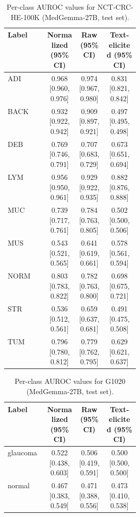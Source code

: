 \begin{table}[htbp]
\centering
\footnotesize
\setlength{\tabcolsep}{4pt}
\caption{Per-class AUROC values for NCT-CRC-HE-100K (MedGemma-27B, test set).}\label{tab:auroc_NCT_CRC_HE_100K_1000}
\begin{tabular}{p{0.3\linewidth}ccc}
\toprule
Label & Normalized (95\% CI) & Raw (95\% CI) & Text-elicited (95\% CI) \\
\midrule
ADI & 0.968 [0.960, 0.976] & 0.974 [0.967, 0.980] & 0.831 [0.821, 0.842] \\
BACK & 0.932 [0.922, 0.942] & 0.909 [0.897, 0.921] & 0.497 [0.495, 0.498] \\
DEB & 0.769 [0.746, 0.791] & 0.707 [0.683, 0.729] & 0.673 [0.651, 0.694] \\
LYM & 0.956 [0.950, 0.961] & 0.929 [0.922, 0.935] & 0.882 [0.876, 0.888] \\
MUC & 0.739 [0.717, 0.761] & 0.784 [0.763, 0.805] & 0.502 [0.500, 0.506] \\
MUS & 0.543 [0.521, 0.565] & 0.641 [0.619, 0.661] & 0.578 [0.561, 0.594] \\
NORM & 0.803 [0.783, 0.822] & 0.782 [0.763, 0.800] & 0.698 [0.675, 0.721] \\
STR & 0.536 [0.512, 0.561] & 0.659 [0.637, 0.681] & 0.491 [0.475, 0.508] \\
TUM & 0.796 [0.780, 0.812] & 0.779 [0.762, 0.795] & 0.629 [0.621, 0.637] \\
\bottomrule
\end{tabular}
\end{table}

\begin{table}[htbp]
\centering
\footnotesize
\setlength{\tabcolsep}{4pt}
\caption{Per-class AUROC values for G1020 (MedGemma-27B, test set).}\label{tab:auroc_G1020}
\begin{tabular}{p{0.3\linewidth}ccc}
\toprule
Label & Normalized (95\% CI) & Raw (95\% CI) & Text-elicited (95\% CI) \\
\midrule
glaucoma & 0.522 [0.438, 0.603] & 0.506 [0.419, 0.591] & 0.500 [0.500, 0.500] \\
normal & 0.467 [0.383, 0.549] & 0.471 [0.388, 0.556] & 0.473 [0.410, 0.538] \\
\bottomrule
\end{tabular}
\end{table}

